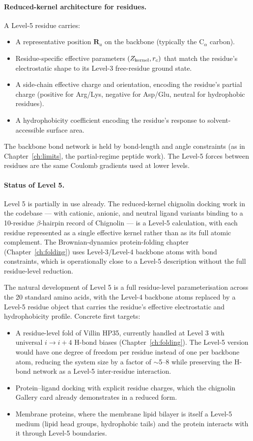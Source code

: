 \paragraph{Reduced-kernel architecture for residues.}
A Level-5 residue carries:
\begin{itemize}
\item A representative position $\mathbf{R}_a$ on the backbone (typically the C$_\alpha$ carbon).
\item Residue-specific effective parameters $(Z_{\rm kernel}, r_c)$ that match the residue's electrostatic shape to its Level-3 free-residue ground state.
\item A side-chain effective charge and orientation, encoding the residue's partial charge (positive for Arg/Lys, negative for Asp/Glu, neutral for hydrophobic residues).
\item A hydrophobicity coefficient encoding the residue's response to solvent-accessible surface area.
\end{itemize}
The backbone bond network is held by bond-length and angle constraints (as in Chapter~\ref{ch:limits}, the partial-regime peptide work). The Level-5 forces between residues are the same Coulomb gradients used at lower levels.

\paragraph{Status of Level 5.}
Level 5 is partially in use already. The reduced-kernel chignolin docking work in the codebase --- with cationic, anionic, and neutral ligand variants binding to a 10-residue $\beta$-hairpin record of Chignolin --- is a Level-5 calculation, with each residue represented as a single effective kernel rather than as its full atomic complement. The Brownian-dynamics protein-folding chapter (Chapter~\ref{ch:folding}) uses Level-3/Level-4 backbone atoms with bond constraints, which is operationally close to a Level-5 description without the full residue-level reduction.

The natural development of Level 5 is a full residue-level parameterisation across the 20 standard amino acids, with the Level-4 backbone atoms replaced by a Level-5 residue object that carries the residue's effective electrostatic and hydrophobicity profile. Concrete first targets:

\begin{itemize}
\item A residue-level fold of Villin HP35, currently handled at Level 3 with universal $i \to i{+}4$ H-bond biases (Chapter~\ref{ch:folding}). The Level-5 version would have one degree of freedom per residue instead of one per backbone atom, reducing the system size by a factor of $\sim$5--8 while preserving the H-bond network as a Level-5 inter-residue interaction.
\item Protein--ligand docking with explicit residue charges, which the chignolin Gallery card already demonstrates in a reduced form.
\item Membrane proteins, where the membrane lipid bilayer is itself a Level-5 medium (lipid head groups, hydrophobic tails) and the protein interacts with it through Level-5 boundaries.
\end{itemize}

